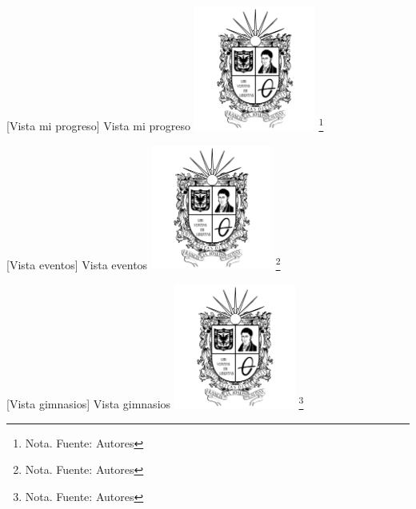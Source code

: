 \begin{itemize}
{    \vspace{2mm}
    \begin{minipage}{0.9\textwidth}
    \centering
    [{Vista mi progreso}]{ Vista mi progreso }
    \label{prot5}
    \includegraphics[width=0.3\textwidth]{Content/Images/Escudo_UD.png}
    \footnote{Nota. \textup{Fuente: Autores}}
    \end{minipage}
    
        \vspace{2mm}
    \begin{minipage}{0.9\textwidth}
    \centering
    [{Vista eventos}]{ Vista eventos }
    \label{prot6}
    \includegraphics[width=0.3\textwidth]{Content/Images/Escudo_UD.png}
    \footnote{Nota. \textup{Fuente: Autores}}
    \end{minipage}

        \vspace{2mm}
    \begin{minipage}{0.9\textwidth}
    \centering
    [{Vista gimnasios}]{ Vista gimnasios }
    \label{prot7}
    \includegraphics[width=0.3\textwidth]{Content/Images/Escudo_UD.png}
    \footnote{Nota. \textup{Fuente: Autores}}
    \end{minipage}

}
\end{itemize}
